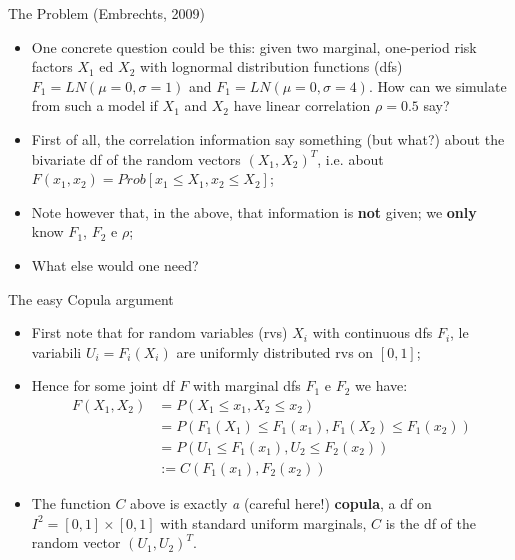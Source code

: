 \documentclass[11pt]{beamer}
\theoremstyle{plain}
\theoremstyle{definition}
\theoremstyle{remark}
\begin{document}
\begin{frame}{The Problem (Embrechts, 2009)}
   \begin{itemize}
      \item  One concrete question could be this: given two marginal, one-period risk factors $X_1$ ed $X_2$ with lognormal distribution 
      functions (dfs) 
       $F_1 = LN(\mu=0, \sigma=1)$ and  $F_1 = LN(\mu=0, \sigma=4)$. How can we simulate from such a model if $X_1$ and $X_2$ 
       have linear correlation $\rho = 0.5$ say?
	  \item First of all, the correlation information say something (but what?) about the bivariate df of the random vectors $(X_1, X_2)^T$, 
	  i.e. about
	    $F(x_1, x_2) = Prob[x_1 \le X_1, x_2 \le X_2]$;
	  \item Note however that, in the above, that information is \textbf{not} given; we \textbf{only} know $F_1$, $F_2$ e $\rho$; 
	  \item What else would one need?
   \end{itemize}
\end{frame}
%
\begin{frame}{The easy Copula argument}
   \begin{itemize}
	    \item First note that for random variables (rvs) $X_i$ with continuous dfs $F_i$, le variabili $U_i= F_i(X_i) $ are uniformly distributed 
	    rvs on $[0, 1]$;
		\item Hence for some joint df $F$ with marginal dfs $F_1$ e $F_2$ we have:
		\begin{equation}
			\begin{split}
			F(X_1, X_2) &= P(X_1 \le x_1, X_2 \le x_2) \\
			&= P(F_1(X_1) \le F_1(x_1), F_1(X_2) \le F_1(x_2)) \\
			&= P(U_1 \le F_1(x_1), U_2 \le F_2(x_2)) \\
			& := C(F_1(x_1), F_2(x_2)) 
			\end{split}
		\end{equation}	  
		\item The function $C$ above is exactly \textit{a} (careful here!) \textbf{copula}, a df on $I^2 = [0, 1] \times [0, 1]$ with standard 
		uniform marginals, $C$ is the df of the random vector $(U_1, U_2)^T$.  
   \end{itemize}
\end{frame}
\end{document}
